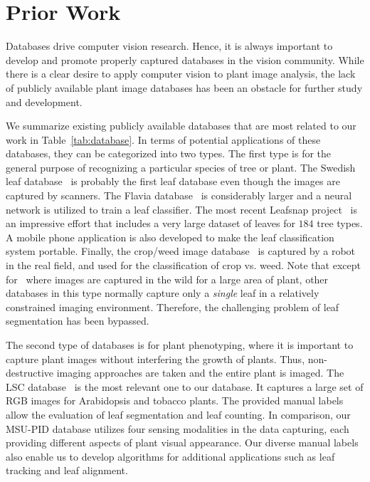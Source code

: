 \section{Prior Work}
\label{sec:prior}

Databases drive computer vision research.
Hence, it is always important to develop and promote properly captured databases in the vision community.
While there is a clear desire to apply computer vision to plant image analysis, the lack of publicly available plant image databases has been an obstacle for further study and development.

We summarize existing publicly available databases that are most related to our work in Table~\ref{tab:database}.
In terms of potential applications of these databases, they can be categorized into two types.
The first type is for the general purpose of recognizing a particular species of tree or plant.
The Swedish leaf database~\cite{soderkvist2001computer} is probably the first leaf database even though the images are captured by scanners.
The Flavia database~\cite{wu2007leaf} is considerably larger and a neural network is utilized to train a leaf classifier.
The most recent Leafsnap project~\cite{kumar2012leafsnap} is an impressive effort that includes a very large dataset of leaves for $184$ tree types.
A mobile phone application is also developed to make the leaf classification system portable.
Finally, the crop/weed image database~\cite{haug2014crop} is captured by a robot in the real field, and used for the classification of crop vs. weed.
Note that except for~\cite{haug2014crop} where images are captured in the wild for a large area of plant, other databases in this type normally capture only a {\it single} leaf in a relatively constrained imaging environment.
Therefore, the challenging problem of leaf segmentation has been bypassed.

The second type of databases is for plant phenotyping, where it is important to capture plant images without interfering the growth of plants.
Thus, non-destructive imaging approaches are taken and the entire plant is imaged. 
The LSC database~\cite{scharr2014annotated} is the most relevant one to our database.
It captures a large set of RGB images for Arabidopsis and tobacco plants.
The provided manual labels allow the evaluation of leaf segmentation and leaf counting.
In comparison, our MSU-PID database utilizes four sensing modalities in the data capturing, each providing different aspects of plant visual appearance.
Our diverse manual labels also enable us to develop algorithms for additional applications such as leaf tracking and leaf alignment.

